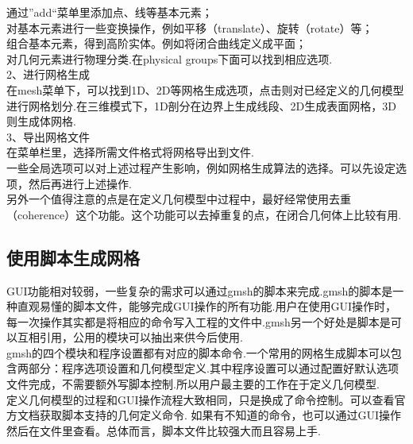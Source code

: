 \documentclass[12pt]{article}
\begin{document}
\begin{CJK}{UTF8}{gkai}
	通过”add“菜单里添加点、线等基本元素；\\
	
	对基本元素进行一些变换操作，例如平移（translate）、旋转（rotate）等；\\
	
	组合基本元素，得到高阶实体。例如将闭合曲线定义成平面；\\
	
	对几何元素进行物理分类.在physical groups下面可以找到相应选项.\\
	
	2、进行网格生成\\
	
	在mesh菜单下，可以找到1D、2D等网格生成选项，点击则对已经定义的几何模型进行网格划分.在三维模式下，1D剖分在边界上生成线段、2D生成表面网格，3D则生成体网格.\\
	
	3、导出网格文件\\
	
	在菜单栏里，选择所需文件格式将网格导出到文件.\\
	
	一些全局选项可以对上述过程产生影响，例如网格生成算法的选择。可以先设定选项，然后再进行上述操作.\\
	
	另外一个值得注意的点是在定义几何模型中过程中，最好经常使用去重（coherence）这个功能。这个功能可以去掉重复的点，在闭合几何体上比较有用.\\
	
	\subsection{使用脚本生成网格}
	
\qquad GUI功能相对较弱，一些复杂的需求可以通过gmsh的脚本来完成.gmsh的脚本是一种直观易懂的脚本文件，能够完成GUI操作的所有功能.用户在使用GUI操作时，每一次操作其实都是将相应的命令写入工程的文件中.gmsh另一个好处是脚本是可以互相引用，公用的模块可以抽出来供今后使用.\\
	
	gmsh的四个模块和程序设置都有对应的脚本命令.一个常用的网格生成脚本可以包含两部分：程序选项设置和几何模型定义.其中程序设置可以通过配置好默认选项文件完成，不需要额外写脚本控制.所以用户最主要的工作在于定义几何模型.\\
	
	定义几何模型的过程和GUI操作流程大致相同，只是换成了命令控制。可以查看官方文档获取脚本支持的几何定义命令. 如果有不知道的命令，也可以通过GUI操作然后在文件里查看。总体而言，脚本文件比较强大而且容易上手.\\
	

\end{CJK}
\end{document}
